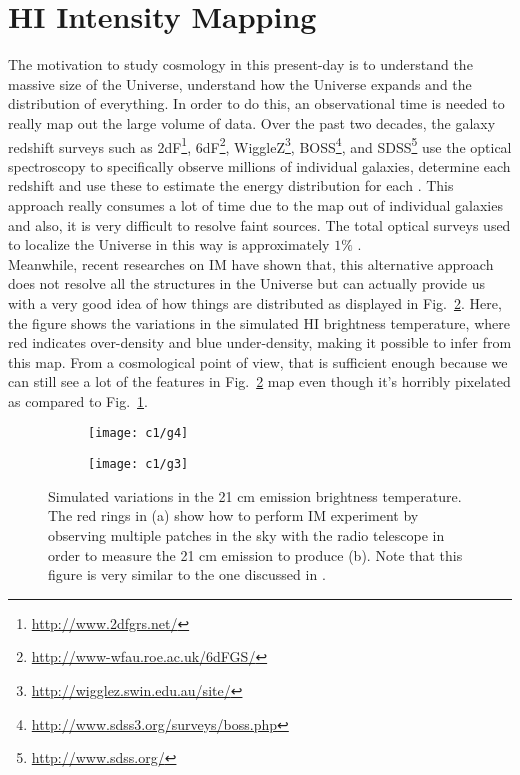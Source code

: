 \section{HI Intensity Mapping} \label{chap1:h1mapping}
The motivation to study cosmology in this present-day is to understand the massive size of the Universe, understand how the Universe expands and the distribution of everything. 
In order to do this, an observational time  is needed to really map out the large volume of data. Over the past two decades, the galaxy redshift surveys 
such as 2dF\footnote{\url{http://www.2dfgrs.net/}}, 6dF\footnote{\url{http://www-wfau.roe.ac.uk/6dFGS/}}, WiggleZ\footnote{\url{http://wigglez.swin.edu.au/site/}}, 
BOSS\footnote{\url{http://www.sdss3.org/surveys/boss.php}}, and SDSS\footnote{\url{http://www.sdss.org/}} 
use the optical spectroscopy to specifically observe millions of individual galaxies, determine each redshift and use these to estimate the energy distribution for each \citep{2009astro2010S.234P,1996ApJ...461...38S,1995ApJ...446..457S}. This approach really consumes a lot of time due to the map out of individual galaxies and also, it is very difficult to resolve faint sources. 
The total optical surveys used to localize the Universe in this way is approximately $1\%$ \citep{2009astro2010S.234P}.\\ %
\indent Meanwhile, recent researches \citep{camera2014cosmology,2008PhRvL.100i1303C,2015aska.confE..19S,2015aska.confE..35W,2014MNRAS.441.3271W} on IM have shown that, this alternative approach does not resolve all the structures in the Universe but can actually provide us with a very good idea of how things are distributed as displayed in
Fig.~\ref{fig:implotb}. Here, the figure shows the variations in the simulated HI brightness temperature, where 
red indicates over-density and blue under-density, making it possible to infer from this map. From a cosmological point of view, that is sufficient enough because we can still see a lot of the features in Fig.~\ref{fig:implotb} map even though it's horribly pixelated as compared to Fig.~\ref{fig:implota}.
% 
\begin{figure}[H]
\begin{minipage}{\linewidth}
\centering
    \begin{subfigure}[b]{0.49\textwidth}
	      \texttt{[image: c1/g4]}               
	      \caption{}                
	      \label{fig:implota}
      \end{subfigure}       
      \begin{subfigure}[b]{0.48\textwidth}
	      \texttt{[image: c1/g3]}                
	      \caption{}               
	      \label{fig:implotb}
      \end{subfigure}        
	\end{minipage}
      \caption{Simulated variations in the 21 cm emission brightness temperature. The red rings in (a) show how to perform IM experiment by observing multiple patches in the sky with 
      the radio telescope in order to measure the 21 cm  emission to produce (b). Note that this figure is very similar to the one discussed in \citep{2009astro2010S.234P}.}%
	\label{fig:implot}
\end{figure}
